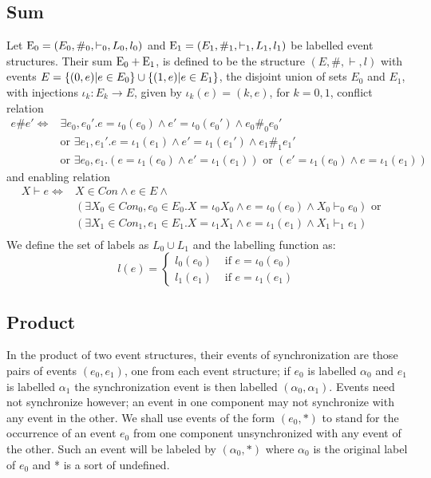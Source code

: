 \subsection{Sum}
\begin{definition}
    Let $\mathrm{E_0} = (E_0,\#_0,\vdash_0,L_0,l_0)$ and
    $\mathrm{E_1} = (E_1,\#_1,\vdash_1,L_1,l_1)$ be labelled event structures.
    Their sum $\mathrm{E_0} + \mathrm{E_1}$, is defined to be the structure $(E,\#,\vdash,l)$
    with events $E = \{(0,e)|e \in E_0\} \cup \{(1,e)|e \in E_1\}$,
    the disjoint union of sets $E_0$ and $E_1$,
    with injections $\iota_k: E_k \rightarrow E$, given by
    $\iota_k(e) = (k,e)$, for $k=0,1$, conflict relation
    \begin{align*}
        e \# e' \iff & \exists e_0,e_0'. e = \iota_0(e_0)
        \wedge e' = \iota_0(e_0') \wedge e_0 \#_0e_0'                       \\
                     & \text{or } \exists e_1,e_1'. e = \iota_1(e_1) \wedge
        e' = \iota_1(e_1') \wedge e_1 \#_1 e_1'                             \\
                     & \text{or } \exists e_0,e_1.(e=\iota_1(e_0)
        \wedge e' =\iota_1(e_1)) \text{ or }
        (e'=\iota_1(e_0) \wedge e =\iota_1(e_1))
    \end{align*}
    and enabling relation
    \begin{align*}
        X \vdash e \iff & X \in Con \wedge e \in E \wedge                   & \\
                        & (\exists X_0 \in Con_0,e_0 \in E_0.X = \iota_0X_0
        \wedge e = \iota_0(e_0) \wedge X_0 \vdash_0 e_0) \text{ or }          \\
                        & (\exists X_1 \in Con_1,e_1 \in E_1.X = \iota_1X_1
        \wedge e = \iota_1(e_1) \wedge X_1 \vdash_1 e_1)                      \\
    \end{align*}
    We define the set of labels as $L_0 \cup L_1$ and the labelling function as:
    $$
        l(e) = \begin{cases}
            l_0(e_0) & \text{ if } e = \iota_0(e_0) \\
            l_1(e_1) & \text{ if } e = \iota_1(e_1)
        \end{cases}
    $$
\end{definition}

\subsection{Product}
In the product of two event structures, their events of synchronization are those pairs of events $(e_0,e_1)$, one from each event structure;
if $e_0$ is labelled $\alpha_0$ and $e_1$ is labelled $\alpha_1$ the synchronization event is
then labelled $(\alpha_0,\alpha_1)$.
Events need not synchronize however; an event in one component may not synchronize with
any event in the other.
We shall use events of the form $(e_0,*)$ to stand for the occurrence of an event $e_0$
from one component unsynchronized with any event of the other.
Such an event will be labeled by $(\alpha_0,*)$ where $\alpha_0$ is the original label of $e_0$
and * is a sort of undefined.

